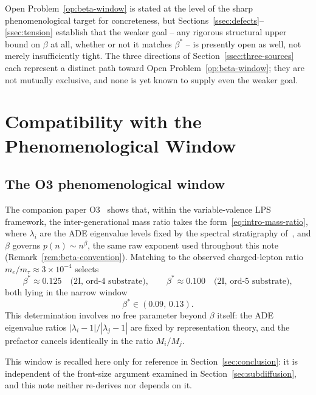 \documentclass[11pt,a4paper]{article}
\theoremstyle{definition}
\theoremstyle{remark}
\begin{document}
  Open Problem~\ref{op:beta-window} is stated at the level of the sharp phenomenological
  target for concreteness, but Sections~\ref{ssec:defects}--\ref{ssec:tension} establish that
  the weaker goal -- any rigorous structural upper bound on $\beta$ at all, whether or not it
  matches $\beta^*$ -- is presently open as well, not merely insufficiently tight.
  The three directions of Section~\ref{ssec:three-sources} each represent a distinct path
  toward Open Problem~\ref{op:beta-window}; they are not mutually exclusive, and none is yet
  known to supply even the weaker goal.

  \section{Compatibility with the Phenomenological Window}
  \label{sec:pheno}

  \subsection{The O3 phenomenological window}
    \label{ssec:o3-window}

    The companion paper O3~\cite{Beau2026a7} shows that, within the variable-valence LPS
    framework, the inter-generational mass ratio takes the form~\eqref{eq:intro-mass-ratio},
    where $\lambda_i$ are the ADE eigenvalue levels fixed by the spectral stratigraphy
    of~\cite{Beau2026a4}, and $\beta$ governs $p(n) \sim n^\beta$, the same raw exponent used
    throughout this note (Remark~\ref{rem:beta-convention}).
    Matching to the observed charged-lepton ratio $m_e / m_\tau \approx 3 \times 10^{-4}$
    selects
    \begin{equation}
      \label{eq:pheno-window-recall}
      \beta^* \approx 0.125
      \quad \text{(2I, ord-4 substrate)},
      \qquad
      \beta^* \approx 0.100
      \quad \text{(2I, ord-5 substrate)},
    \end{equation}
    both lying in the narrow window
    \begin{equation}
      \label{eq:pheno-window-interval}
      \beta^* \in (0.09,\, 0.13).
    \end{equation}
    This determination involves no free parameter beyond $\beta$ itself: the ADE eigenvalue
    ratios $|\lambda_i - 1|/|\lambda_j - 1|$ are fixed by representation theory, and the
    prefactor cancels identically in the ratio $M_i/M_j$.

    This window is recalled here only for reference in Section~\ref{sec:conclusion}: it is
    independent of the front-size argument examined in Section~\ref{sec:subdiffusion}, and
    this note neither re-derives nor depends on it.
\end{document}
